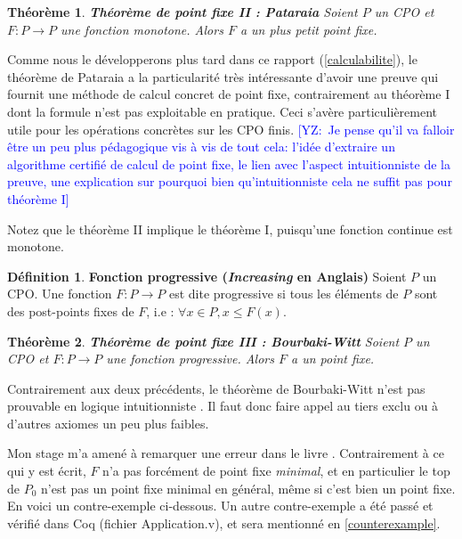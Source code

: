 \documentclass{article}
\newcommand{\yz}[1]{\textcolor{blue}{{[YZ:~#1]}}}
\newtheorem{theorem}{Théorème}[section]
\theoremstyle{definition}
\newtheorem{definition}{Définition}[section]
\begin{document}
\begin{theorem}{\textbf{Théorème de point fixe II : Pataraia}}
Soient $P$ un CPO et $F : P \rightarrow P$ une fonction monotone. Alors $F$ a un plus petit point fixe.
\end{theorem}

Comme nous le développerons plus tard dans ce rapport (\ref{calculabilite}), le théorème de Pataraia a
la particularité très intéressante d'avoir une preuve qui fournit une méthode de calcul concret de point fixe, contrairement au théorème I dont la formule n'est pas exploitable en pratique. Ceci s'avère particulièrement utile pour les opérations concrètes sur les CPO finis. %
\yz{Je pense qu'il va falloir être un peu plus pédagogique vis à   vis de tout cela: l'idée d'extraire un algorithme certifié de calcul de point   fixe, le lien avec l'aspect intuitionniste de la preuve, une explication sur pourquoi bien qu’intuitionniste cela ne suffit pas pour théorème I}

Notez que le théorème II implique le théorème I, puisqu'une fonction continue est monotone.

\begin{definition}{\textbf{Fonction progressive (\textit{Increasing} en Anglais)}}
Soient $P$ un CPO. Une fonction $F : P \rightarrow P$ est dite progressive si tous les éléments de $P$ sont des post-points fixes de $F$, i.e : $\forall x \in P, x \leq F(x)$.

\end{definition}

\begin{theorem}{\textbf{Théorème de point fixe III : Bourbaki-Witt}}
Soient $P$ un CPO et $F : P \rightarrow P$ une fonction progressive. Alors $F$ a un point fixe.
\end{theorem}

Contrairement aux deux précédents, le théorème de Bourbaki-Witt n'est pas prouvable en logique intuitionniste \cite{bw}. Il faut donc faire appel au tiers exclu ou à d'autres axiomes un peu plus faibles.

Mon stage m'a amené à remarquer une erreur dans le livre \cite[page 188]{main}.
Contrairement à ce qui y est écrit, $F$ n'a pas forcément de point fixe \emph{minimal}, et en particulier le top de $P_0$ n'est pas un point fixe minimal en général, même si c'est bien un point fixe. En voici un contre-exemple ci-dessous. Un autre contre-exemple a été passé et vérifié dans Coq (fichier Application.v), et sera mentionné en \ref{counterexample}.
\end{document}
